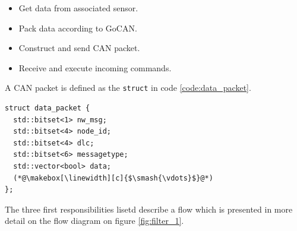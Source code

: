 \begin{itemize}
\item Get data from associated sensor.
\item Pack data according to GoCAN.
\item Construct and send CAN packet.
\item Receive and execute incoming commands.
\end{itemize}

A CAN packet is defined as the \texttt{struct} in code \ref{code:data_packet}.
\begin{lstlisting}[caption=Struct for data packet.,label=code:data_packet]
struct data_packet {
  std::bitset<1> nw_msg;
  std::bitset<4> node_id;
  std::bitset<4> dlc;
  std::bitset<6> messagetype;
  std::vector<bool> data; 
  (*@\makebox[\linewidth][c]{$\smash{\vdots}$}@*)
};
\end{lstlisting}

The three first responsibilities lisetd describe a flow which is presented in more detail on the flow diagram on figure \ref{fig:filter_1}.

